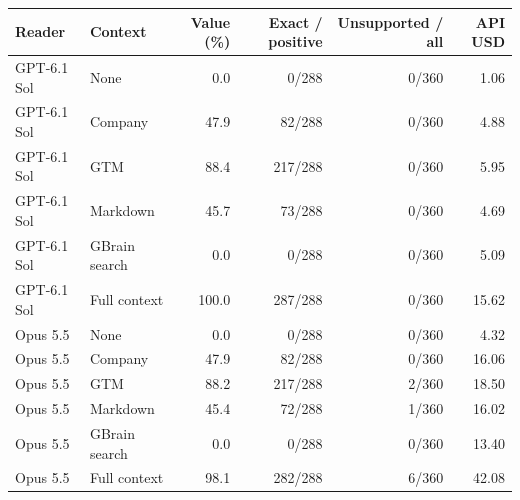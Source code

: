 \begin{tabular}{llrrrr}
\toprule
Reader & Context & Value (\%) & Exact / positive & Unsupported / all & API USD \\
\midrule
GPT-6.1 Sol & None & 0.0 & 0/288 & 0/360 & 1.06 \\
GPT-6.1 Sol & Company & 47.9 & 82/288 & 0/360 & 4.88 \\
GPT-6.1 Sol & GTM & 88.4 & 217/288 & 0/360 & 5.95 \\
GPT-6.1 Sol & Markdown & 45.7 & 73/288 & 0/360 & 4.69 \\
GPT-6.1 Sol & GBrain search & 0.0 & 0/288 & 0/360 & 5.09 \\
GPT-6.1 Sol & Full context & 100.0 & 287/288 & 0/360 & 15.62 \\
\midrule
Opus 5.5 & None & 0.0 & 0/288 & 0/360 & 4.32 \\
Opus 5.5 & Company & 47.9 & 82/288 & 0/360 & 16.06 \\
Opus 5.5 & GTM & 88.2 & 217/288 & 2/360 & 18.50 \\
Opus 5.5 & Markdown & 45.4 & 72/288 & 1/360 & 16.02 \\
Opus 5.5 & GBrain search & 0.0 & 0/288 & 0/360 & 13.40 \\
Opus 5.5 & Full context & 98.1 & 282/288 & 6/360 & 42.08 \\
\bottomrule
\end{tabular}
